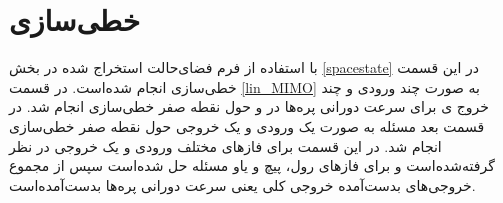 \section{خطی‌سازی}
با استفاده از فرم فضای‌حالت استخراج شده در بخش 
\ref{spacestate}
در این قسمت خطی‌سازی انجام شده‌است. در قسمت 
\ref{lin_MIMO}
به صورت چند ورودی و چند خروج
ی برای سرعت دورانی پره‌ها در  
و حول نقطه صفر خطی‌سازی انجام شد. در قسمت بعد مسئله به صورت یک ورودی و یک خروجی 
حول نقطه صفر خطی‌سازی انجام شد. در این قسمت برای فازهای مختلف ورودی و یک خروجی در نظر گرفته‌شده‌است و برای فازهای رول، پیچ و یاو مسئله حل شده‌است  سپس از مجموع خروجی‌های بدست‌آمده خروجی کلی یعنی سرعت دورانی پره‌ها بدست‌آمده‌است.